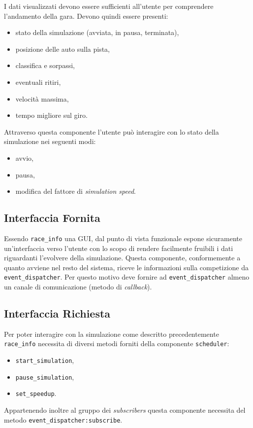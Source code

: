 \documentclass[a4paper]{report}
\newcommand{\fun}[1]{\texttt{#1}}
\begin{document}
I dati visualizzati devono essere sufficienti all'utente per comprendere l'andamento della gara. Devono quindi essere presenti:
\begin{itemize}
\item stato della simulazione (avviata, in pausa, terminata),
\item posizione delle auto sulla pista,
\item classifica e sorpassi,
\item eventuali ritiri,
\item velocità massima,
\item tempo migliore sul giro.
\end{itemize}
Attraverso questa componente l'utente può interagire con lo stato della simulazione nei seguenti modi:
\begin{itemize}
\item avvio,
\item pausa,
\item modifica del fattore di \textit{simulation speed}.
\end{itemize}

\subsection*{Interfaccia Fornita}
Essendo \texttt{race\_info} una GUI, dal punto di vista funzionale espone sicuramente un'interfaccia verso l'utente con lo scopo di rendere facilmente fruibili i dati riguardanti l'evolvere della simulazione.
Questa componente, conformemente a quanto avviene nel resto del sistema, riceve le informazioni sulla competizione da \texttt{event\_dispatcher}. Per questo motivo deve fornire ad \texttt{event\_dispatcher} almeno un canale di comunicazione (metodo di \textit{callback}).

\subsection*{Interfaccia Richiesta}
Per poter interagire con la simulazione come descritto precedentemente \texttt{race\_info} necessita di diversi metodi forniti della componente \texttt{scheduler}:
\begin{itemize}
\item \fun{start\_simulation},
\item \fun{pause\_simulation},
\item \fun{set\_speedup}.
\end{itemize}
Appartenendo inoltre al gruppo dei \textit{subscribers} questa componente necessita del metodo \fun{event\_dispatcher:subscribe}.
\end{document}

